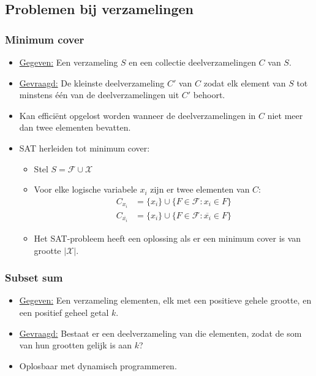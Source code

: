 \documentclass{report}
\begin{document}
\subsection{Problemen bij verzamelingen}
\subsubsection{Minimum cover}
\begin{itemize}
	\item[\info] \underline{Gegeven:} Een verzameling $S$ en een collectie deelverzamelingen $C$ van $S$.
	\item[\info] \underline{Gevraagd:} De kleinste deelverzameling $C'$ van $C$ zodat elk element van $S$ tot minstens één van de deelverzamelingen uit $C'$ behoort.
	\item[\info] Kan efficiënt opgelost worden wanneer de deelverzamelingen in $C$ niet meer dan twee elementen bevatten.
	\item[\info] SAT herleiden tot minimum cover:
	\begin{itemize}
		\item Stel $S = \mathcal{F} \cup \mathcal{X}$
		\item Voor elke logische variabele $x_i$ zijn er twee elementen van $C$:
		\begin{equation*}
			\begin{split}
				C_{x_i} & = \{x_i\} \cup \{F \in \mathcal{F} : x_i \in F\} \\
				C_{\overline{x_i}} & = \{x_i\} \cup \{F \in \mathcal{F} : \overline{x_i} \in F\}
			\end{split}
		\end{equation*}
		\item Het SAT-probleem heeft een oplossing als er een minimum cover is van grootte $|\mathcal{X}|$.
	\end{itemize}
\end{itemize}
\subsubsection{Subset sum}
\begin{itemize}
	\item[\info] \underline{Gegeven:} Een verzameling elementen, elk met een positieve gehele grootte, en een positief geheel getal $k$.
	\item[\info] \underline{Gevraagd:} Bestaat er een deelverzameling van die elementen, zodat de som van hun grootten gelijk is aan $k$?
	\item[\info] Oplosbaar met dynamisch programmeren.
\end{itemize}
\end{document}
